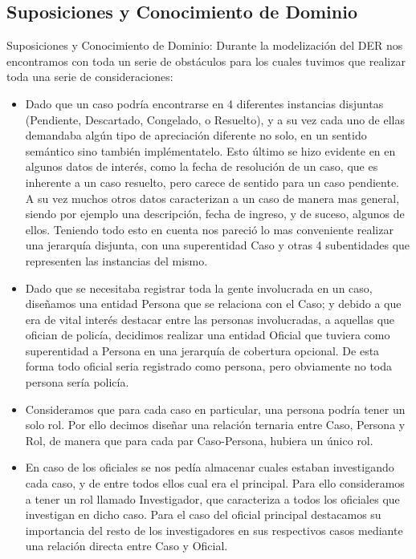 \documentclass{article}
\theoremstyle{definition}
\theoremstyle{remark}
\begin{document}
\subsection{Suposiciones y Conocimiento de Dominio}


Suposiciones y Conocimiento de Dominio:
Durante la modelización del DER nos encontramos con toda un serie de obstáculos para los cuales tuvimos que realizar toda una serie de consideraciones:

\begin{itemize}
\item Dado que un caso podría encontrarse en 4 diferentes instancias disjuntas (Pendiente, Descartado, Congelado, o Resuelto), y a su vez cada uno de ellas demandaba algún tipo de apreciación diferente no solo, en un sentido semántico sino también implémentatelo. Esto último se hizo evidente en en algunos datos de interés, como la fecha de resolución de un caso, que es inherente a un caso resuelto, pero carece de sentido para un caso pendiente. A su vez muchos otros datos caracterizan a un caso de manera mas general, siendo por ejemplo una descripción, fecha de ingreso, y de suceso, algunos de ellos. Teniendo todo esto en cuenta nos pareció lo mas conveniente realizar una jerarquía disjunta, con una superentidad Caso y otras 4 subentidades que representen las instancias del mismo.

\item Dado que se necesitaba registrar toda la gente involucrada en un caso, diseñamos una entidad Persona que se relaciona con el Caso; y debido a que era de vital interés destacar entre las personas involucradas, a aquellas que ofician de policía, decidimos realizar una entidad Oficial que tuviera como superentidad a Persona en una jerarquía de cobertura opcional. De esta forma todo oficial seria registrado como persona, pero obviamente no toda persona sería policía.

\item Consideramos que para cada caso en particular, una persona podría tener un solo rol. Por ello decimos diseñar una relación ternaria entre Caso, Persona y Rol, de manera que para cada par Caso-Persona, hubiera un único rol.

\item En caso de los oficiales se nos pedía almacenar cuales estaban investigando cada caso, y de entre todos ellos cual era el principal. Para ello consideramos a tener un rol llamado Investigador, que caracteriza a todos los oficiales que investigan en dicho caso. Para el caso del oficial principal destacamos su importancia del resto de los investigadores en sus respectivos casos mediante una relación directa entre Caso y Oficial.


\end{itemize}
\end{document}
